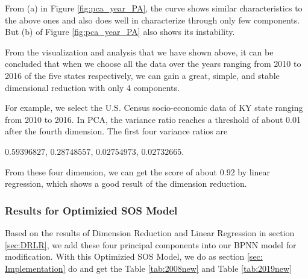 \documentclass{mcmthesis}
\begin{document}
From (a) in Figure \ref{fig:pca_year_PA}, the curve shows similar characteristics to the above ones and also does well in characterize through only few components. But (b) of Figure \ref{fig:pca_year_PA} also shows its instability.

From the visualization and analysis that we have shown above, it can be concluded that when we choose all the data over the years ranging from 2010 to 2016 of the five states respectively, we can gain a great, simple, and stable dimensional reduction with only 4 components.

For example, we select the U.S. Census socio-economic data of KY state ranging from 2010 to 2016. In PCA, the variance ratio reaches a threshold of about 0.01 after the fourth dimension. The first four variance ratios are 
\begin{center}
    $0.59396827$, $0.28748557$, $0.02754973$, $0.02732665$.
\end{center}

From these four dimension, we can get the score of about $0.92$ by linear regression, which shows a good result of the dimension reduction. 

\subsubsection{Results for Optimizied SOS Model}
Based on the results of Dimension Reduction and Linear Regression in section \ref{sec:DRLR}, we add these four principal components into our BPNN model for modification. With this Optimizied SOS Model, we do as section \ref{sec: Implementation} do and get the Table \ref{tab:2008new} and Table \ref{tab:2019new}
\end{document}
